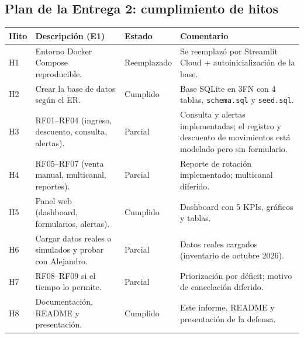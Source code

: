 \documentclass[11pt,letterpaper]{article}
\renewcommand{\_}{\oldus\allowbreak}
\newcommand{\cumple}{Cumplido}
\newcommand{\parcial}{Parcial}
\begin{document}
\subsection{Plan de la Entrega 2: cumplimiento de hitos}
\begin{center}
\small
\begin{tabularx}{\textwidth}{>{\raggedright\arraybackslash}p{0.8cm} >{\raggedright\arraybackslash}p{5.0cm} >{\raggedright\arraybackslash}p{2.4cm} >{\raggedright\arraybackslash}X}
\toprule
\textbf{Hito} & \textbf{Descripción (E1)} & \textbf{Estado} & \textbf{Comentario} \\
\midrule
H1 & Entorno Docker Compose reproducible. & Reemplazado & Se reemplazó por Streamlit Cloud + autoinicialización de la base. \\
H2 & Crear la base de datos según el ER. & \cumple & Base SQLite en 3FN con 4 tablas, \texttt{schema.sql} y \texttt{seed.sql}. \\
H3 & RF01–RF04 (ingreso, descuento, consulta, alertas). & \parcial & Consulta y alertas implementadas; el registro y descuento de movimientos está modelado pero sin formulario. \\
H4 & RF05–RF07 (venta manual, multicanal, reportes). & \parcial & Reporte de rotación implementado; multicanal diferido. \\
H5 & Panel web (dashboard, formularios, alertas). & \cumple & Dashboard con 5 KPIs, gráficos y tablas. \\
H6 & Cargar datos reales o simulados y probar con Alejandro. & \parcial & Datos reales cargados (inventario de octubre 2026). \\
H7 & RF08–RF09 si el tiempo lo permite. & \parcial & Priorización por déficit; motivo de cancelación diferido. \\
H8 & Documentación, README y presentación. & \cumple & Este informe, README y presentación de la defensa. \\
\bottomrule
\end{tabularx}
\end{center}
\end{document}
